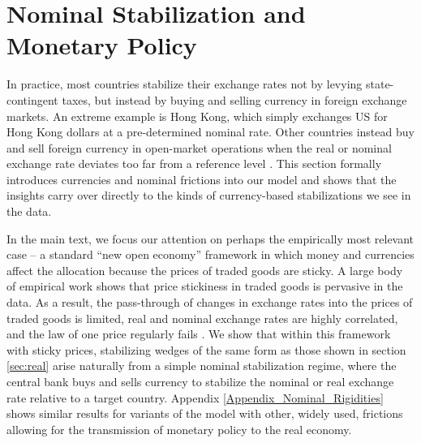 \documentclass[12pt,letter]{article}
\theoremstyle{break} \theorembodyfont{\normalfont\itshape}
\theoremstyle{break}
\theoremstyle{break} \theorembodyfont{\normalfont\itshape}
\theoremstyle{break} \theorembodyfont{\normalfont\itshape}
\begin{document}
\section{Nominal Stabilization and Monetary
  Policy \label{sec:nominal}}

In practice, most countries stabilize their exchange rates not by
levying state-contingent taxes, but instead by buying and selling
currency in foreign exchange markets. An extreme example is Hong Kong,
which simply exchanges US for Hong Kong dollars at a pre-determined
nominal rate. Other countries instead buy and sell foreign currency in
open-market operations when the real or nominal exchange rate deviates
too far from a reference level \citep{SarnoTaylor2001}. This
section formally introduces currencies and
nominal frictions into our model and shows that the insights
carry over directly to the kinds of currency-based stabilizations we
see in the data.

In the main text, we focus our attention on perhaps the empirically
most relevant case -- a standard ``new open economy'' framework in
which money and currencies affect the allocation because the prices of
traded goods are sticky. A large body of empirical work shows that price
stickiness in traded goods is pervasive in the data. As a result, the pass-through
of changes in exchange rates into the prices of traded goods is
limited, real and nominal exchange rates are highly correlated, and
the law of one price regularly fails \citep{Mussa1986, Engel1999,
  CavalloNeimanRigobon2014}. We show that within this framework with sticky prices,
stabilizing wedges of the same form as those shown in section
\ref{sec:real} arise naturally from a simple nominal stabilization
regime, where the central bank buys and sells currency to stabilize
the nominal or real exchange rate relative to a target country.
Appendix \ref{Appendix_Nominal_Rigidities} shows similar results for
variants of the model with other, widely used, frictions allowing for the transmission of
monetary policy to the real economy.
\end{document}
